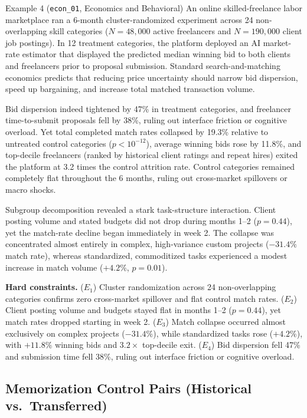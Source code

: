 \documentclass{article}
\begin{document}
\begin{scenariobox}{Example 4 (\texttt{econ\_01}, Economics and Behavioral)}
An online skilled-freelance labor marketplace ran a 6-month cluster-randomized experiment across 24 non-overlapping skill categories ($N = 48,000$ active freelancers and $N = 190,000$ client job postings). In 12 treatment categories, the platform deployed an AI market-rate estimator that displayed the predicted median winning bid to both clients and freelancers prior to proposal submission. Standard search-and-matching economics predicts that reducing price uncertainty should narrow bid dispersion, speed up bargaining, and increase total matched transaction volume.

Bid dispersion indeed tightened by 47\% in treatment categories, and freelancer time-to-submit proposals fell by 38\%, ruling out interface friction or cognitive overload. Yet total completed match rates collapsed by 19.3\% relative to untreated control categories ($p < 10^{-12}$), average winning bids rose by 11.8\%, and top-decile freelancers (ranked by historical client ratings and repeat hires) exited the platform at 3.2 times the control attrition rate. Control categories remained completely flat throughout the 6 months, ruling out cross-market spillovers or macro shocks.

Subgroup decomposition revealed a stark task-structure interaction. Client posting volume and stated budgets did not drop during months 1--2 ($p = 0.44$), yet the match-rate decline began immediately in week 2. The collapse was concentrated almost entirely in complex, high-variance custom projects ($-31.4\%$ match rate), whereas standardized, commoditized tasks experienced a modest increase in match volume ($+4.2\%$, $p = 0.01$).

\textbf{Hard constraints.}
($E_1$) Cluster randomization across 24 non-overlapping categories confirms zero cross-market spillover and flat control match rates.
($E_2$) Client posting volume and budgets stayed flat in months 1--2 ($p = 0.44$), yet match rates dropped starting in week 2.
($E_3$) Match collapse occurred almost exclusively on complex projects ($-31.4\%$), while standardized tasks rose ($+4.2\%$), with $+11.8\%$ winning bids and $3.2\times$ top-decile exit.
($E_4$) Bid dispersion fell 47\% and submission time fell 38\%, ruling out interface friction or cognitive overload.
\end{scenariobox}

\subsection*{Memorization Control Pairs (Historical vs.\ Transferred)}
\end{document}
